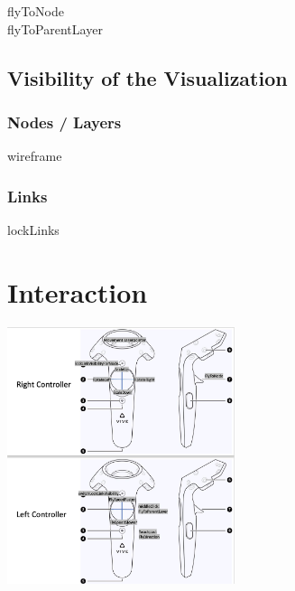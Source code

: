 flyToNode \\
flyToParentLayer \\

\subsection{Visibility of the Visualization}
\subsubsection{Nodes / Layers}
wireframe
\subsubsection{Links}
lockLinks

\section{Interaction}
\includegraphics[width=0.5\textwidth]{chapters/graphics/controllerMapping.jpg}
